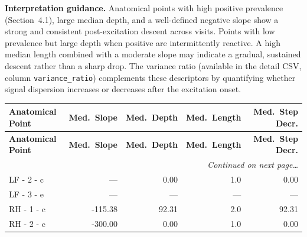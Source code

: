 \documentclass[a4paper,11pt]{article}
\begin{document}
\medskip
\noindent\textbf{Interpretation guidance.}
Anatomical points with high positive prevalence (Section~4.1), large median depth, and a
well-defined negative slope show a strong and consistent post-excitation descent across
visits.
Points with low prevalence but large depth when positive are intermittently reactive.
A high median length combined with a moderate slope may indicate a gradual, sustained
descent rather than a sharp drop.
The variance ratio (available in the detail CSV, column \texttt{variance\_ratio}) complements
these descriptors by quantifying whether signal dispersion increases or decreases after the
excitation onset.

\begin{small}
\begin{longtable}{p{4.5cm}rrrr}
\toprule
\textbf{Anatomical Point} &
\textbf{Med.\ Slope} &
\textbf{Med.\ Depth} &
\textbf{Med.\ Length} &
\textbf{Med.\ Step Decr.} \\
\midrule
\endfirsthead
\toprule
\textbf{Anatomical Point} &
\textbf{Med.\ Slope} &
\textbf{Med.\ Depth} &
\textbf{Med.\ Length} &
\textbf{Med.\ Step Decr.} \\
\midrule
\endhead
\midrule
\multicolumn{5}{r}{\small\emph{Continued on next page\ldots}} \\
\endfoot
\bottomrule
\endlastfoot
LF - 2 - c & --- & 0.00 & 1.0 & 0.00 \\
LF - 3 - e & --- & --- & --- & --- \\
RH - 1 - c & -115.38 & 92.31 & 2.0 & 92.31 \\
RH - 2 - c & -300.00 & 0.00 & 1.0 & 0.00 \\
\end{longtable}
\end{small}
\end{document}
